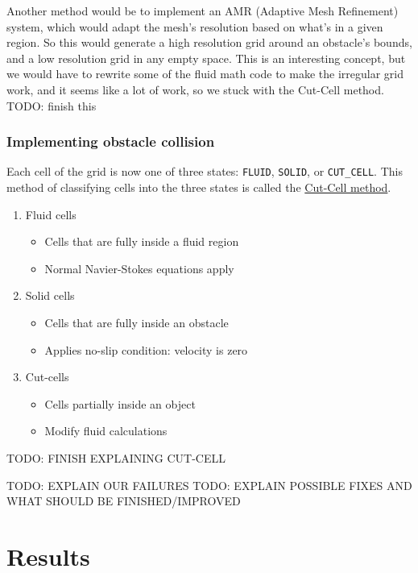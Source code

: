 \documentclass[a4paper,12pt]{article}
\begin{document}
Another method would be to implement an AMR (Adaptive Mesh Refinement) system,
which would adapt the mesh's resolution based on what's in a given region. So this would
generate a high resolution grid around an obstacle's bounds, and a low resolution
grid in any empty space. This is an interesting concept, but we would have to
rewrite some of the fluid math code to make the irregular grid work, and it seems
like a lot of work, so we stuck with the Cut-Cell method. TODO: finish this

\subsubsection{Implementing obstacle collision}
Each cell of the grid is now one of three states: \lstinline{FLUID},
\lstinline{SOLID}, or \lstinline{CUT_CELL}. This method of classifying cells
into the three states is called the \href{https://www.sciencedirect.com/science/article/pii/S0307904X00000056}{Cut-Cell method}.
\begin{enumerate}
	\item{Fluid cells}
		\begin{itemize}
			\item{Cells that are fully inside a fluid region}
			\item{Normal Navier-Stokes equations apply}
		\end{itemize}
	\item{Solid cells}
		\begin{itemize}
			\item{Cells that are fully inside an obstacle}
			\item{Applies no-slip condition: velocity is zero}
		\end{itemize}
	\item{Cut-cells}
		\begin{itemize}
			\item{Cells partially inside an object}
			\item{Modify fluid calculations}
		\end{itemize}
\end{enumerate}

TODO: FINISH EXPLAINING CUT-CELL

TODO: EXPLAIN OUR FAILURES
TODO: EXPLAIN POSSIBLE FIXES AND WHAT SHOULD BE FINISHED/IMPROVED

\section{Results}
\ipsum[1]
\end{document}
